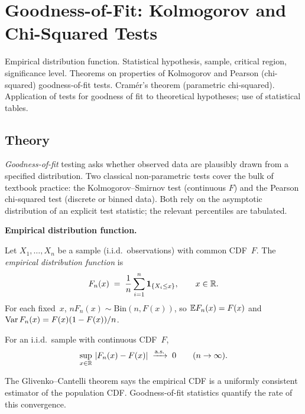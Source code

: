 
\section{Goodness-of-Fit: Kolmogorov and Chi-Squared Tests}
\label{sec:1.2.13-goodness-of-fit}

\begin{ticket}
Empirical distribution function. Statistical hypothesis, sample, critical region, significance level. Theorems on properties of Kolmogorov and Pearson (chi-squared) goodness-of-fit tests. Cramér's theorem (parametric chi-squared). Application of tests for goodness of fit to theoretical hypotheses; use of statistical tables.
\end{ticket}

\subsection*{Theory}

\emph{Goodness-of-fit} testing asks whether observed data are
plausibly drawn from a specified distribution. Two classical
non-parametric tests cover the bulk of textbook practice: the
Kolmogorov–Smirnov test (continuous $F$) and the Pearson
chi-squared test (discrete or binned data). Both rely on the
asymptotic distribution of an explicit test statistic; the
relevant percentiles are tabulated.

\medskip
\noindent\textbf{Empirical distribution function.}

\begin{definition}
\label{def:empirical-cdf}
Let $X_1, \dots, X_n$ be a sample (i.i.d.\ observations) with
common CDF~$F$. The \emph{empirical distribution function} is
\[
  F_n(x) \;=\; \frac{1}{n} \sum_{i=1}^{n} \mathbf{1}_{\{X_i \leq x\}}, \qquad x \in \mathbb{R}.
\]
For each fixed~$x$, $n F_n(x) \sim \mathrm{Bin}(n, F(x))$, so
$\mathbb{E} F_n(x) = F(x)$ and $\operatorname{Var} F_n(x) = F(x)(1 - F(x))/n$.
\end{definition}

\begin{theorem}
\label{thm:glivenko-cantelli}
For an i.i.d.\ sample with continuous CDF~$F$,
\[
  \sup_{x \in \mathbb{R}}\, |F_n(x) - F(x)| \;\xrightarrow{\text{a.s.}}\; 0 \qquad (n \to \infty).
\]
\end{theorem}

The Glivenko–Cantelli theorem says the empirical CDF is a uniformly
consistent estimator of the population CDF. Goodness-of-fit
statistics quantify the rate of this convergence.


